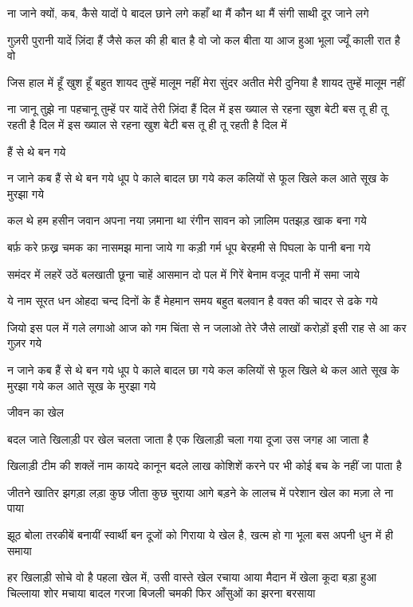 ना जाने क्यों, कब, कैसे
यादों पे बादल छाने लगे
कहाँ था मैं कौन था मैं
संगी साथी दूर जाने लगे


गुज़री पुरानी यादें ज़िंदा हैं
जैसे कल की ही बात है वो
जो कल बीता या आज हुआ
भूला ज्यूँ काली रात है वो

जिस हाल में हूँ खुश हूँ बहुत
शायद तुम्हें मालूम नहीं
मेरा सुंदर अतीत मेरी दुनिया है
शायद तुम्हें मालूम नहीं


ना जानू तुझे ना पहचानू तुम्हें
पर यादें तेरी ज़िंदा हैं दिल में
इस ख्याल से रहना खुश बेटी
बस तू ही तू रहती है दिल में
इस ख्याल से रहना खुश बेटी
बस तू ही तू रहती है दिल में




हैं से थे बन गये

न जाने कब हैं से थे बन गये
धूप पे काले बादल छा गये
कल कलियों से फूल खिले
कल आते सूख के मुरझा गये

कल थे हम हसीन जवान
अपना नया ज़माना था
रंगीन सावन को ज़ालिम
पतझड़ खाक बना गये

बर्फ़ करे फ़ख्र चमक का
नासमझ माना जाये गा
कड़ी गर्म धूप बेरहमी से
पिघला के पानी बना गये

समंदर में लहरें उठें बलखाती
छूना चाहें आसमान
दो पल में गिरें बेनाम
वजूद पानी में समा जाये

ये नाम सूरत धन ओहदा
चन्द दिनों के हैं मेहमान
समय बहुत बलवान है
वक्त की चादर से ढके गये

जियो इस पल में गले लगाओ
आज को गम चिंता से न जलाओ
तेरे जैसे लाखों करोड़ों
इसी राह से आ कर गुज़र गये

न जाने कब हैं से थे बन गये
धूप पे काले बादल छा गये
कल कलियों से फूल खिले थे
कल आते सूख के मुरझा गये
कल आते सूख के मुरझा गये



जीवन का खेल

बदल जाते खिलाड़ी पर
खेल चलता जाता है
एक खिलाड़ी चला गया
दूजा उस जगह आ जाता है

खिलाड़ी टीम की शक्लें नाम
कायदे कानून बदले
लाख कोशिशें करने पर भी
कोई बच के नहीं जा पाता है


जीतने खातिर झगड़ा लड़ा
कुछ जीता कुछ चुराया
आगे बड़ने के लालच में परेशान
खेल का मज़ा ले ना पाया

झूठ बोला तरकीबें बनायीं
स्वार्थी बन दूजों को गिराया
ये खेल है, खत्म हो गा भूला
बस अपनी धुन में ही समाया


हर खिलाड़ी सोचे वो है पहला 
खेल में, उसी वास्ते खेल रचाया
आया मैदान में खेला कूदा
बड़ा हुआ चिल्लाया शोर मचाया
बादल गरजा बिजली चमकी
फिर आँसुओं का झरना बरसाया






